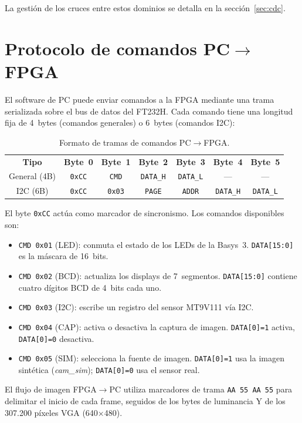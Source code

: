 \documentclass[../main.tex]{subfiles}
\begin{document}
La gestión de los cruces entre estos dominios se detalla en la sección~\ref{sec:cdc}.

\section{Protocolo de comandos PC$\rightarrow$FPGA}

El software de PC puede enviar comandos a la FPGA mediante una trama serializada sobre el bus de datos del FT232H. Cada comando tiene una longitud fija de 4~bytes (comandos generales) o 6~bytes (comandos I2C):

\begin{table}[h]
\centering
\caption{Formato de tramas de comandos PC$\rightarrow$FPGA.}
\label{tab:protocolo_comandos}
\begin{tabular}{ccccccc}
\rowcolor[HTML]{156082}
{\color{white}\textbf{Tipo}} & {\color{white}\textbf{Byte~0}} & {\color{white}\textbf{Byte~1}} & {\color{white}\textbf{Byte~2}} & {\color{white}\textbf{Byte~3}} & {\color{white}\textbf{Byte~4}} & {\color{white}\textbf{Byte~5}} \\
\rowcolor[HTML]{C0E6F5}
General (4B) & \texttt{0xCC} & \texttt{CMD} & \texttt{DATA\_H} & \texttt{DATA\_L} & --- & --- \\
I2C (6B)     & \texttt{0xCC} & \texttt{0x03} & \texttt{PAGE} & \texttt{ADDR} & \texttt{DATA\_H} & \texttt{DATA\_L} \\
\end{tabular}
\end{table}

El byte \texttt{0xCC} actúa como marcador de sincronismo. Los comandos disponibles son:

\begin{itemize}
    \item \texttt{CMD 0x01} (LED): conmuta el estado de los LEDs de la Basys~3. \texttt{DATA[15:0]} es la máscara de 16~bits.
    \item \texttt{CMD 0x02} (BCD): actualiza los displays de 7~segmentos. \texttt{DATA[15:0]} contiene cuatro dígitos BCD de 4~bits cada uno.
    \item \texttt{CMD 0x03} (I2C): escribe un registro del sensor MT9V111 vía I2C.
    \item \texttt{CMD 0x04} (CAP): activa o desactiva la captura de imagen. \texttt{DATA[0]=1} activa, \texttt{DATA[0]=0} desactiva.
    \item \texttt{CMD 0x05} (SIM): selecciona la fuente de imagen. \texttt{DATA[0]=1} usa la imagen sintética (\textit{cam\_sim}); \texttt{DATA[0]=0} usa el sensor real.
\end{itemize}

El flujo de imagen FPGA$\rightarrow$PC utiliza marcadores de trama \texttt{AA 55 AA 55} para delimitar el inicio de cada frame, seguidos de los bytes de luminancia Y de los 307.200 píxeles VGA (640$\times$480).
\end{document}
